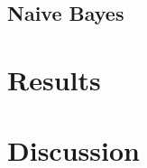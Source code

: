 \documentclass{article}
\begin{document}
\subsection{Naive Bayes}

\section{Results}

\section{Discussion}



\end{document}
